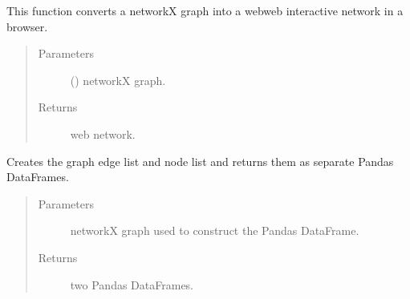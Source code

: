 \documentclass[letterpaper,10pt,english]{sphinxmanual}
\begin{document}

\begin{fulllineitems}
\label{\detokenize{_autosummary/analytics_core.viz:analytics_core.viz.viz.get_notebook_network_web}}
This function converts a networkX graph into a webweb interactive network in a browser.
\begin{quote}\begin{description}
\item[{Parameters}] \leavevmode
{} () \textendash{} networkX graph.

\item[{Returns}] \leavevmode
web network.

\end{description}\end{quote}

\end{fulllineitems}


\begin{fulllineitems}
\label{\detokenize{_autosummary/analytics_core.viz:analytics_core.viz.viz.network_to_tables}}
Creates the graph edge list and node list and returns them as separate Pandas DataFrames.
\begin{quote}\begin{description}
\item[{Parameters}] \leavevmode
{} \textendash{} networkX graph used to construct the Pandas DataFrame.

\item[{Returns}] \leavevmode
two Pandas DataFrames.

\end{description}\end{quote}

\end{fulllineitems}
\end{document}
